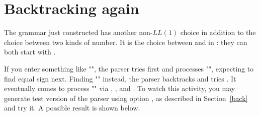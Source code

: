
\section{Backtracking again\label{back2}}


The grammar just constructed has another non-$LL(1)$ choice
in addition to the choice between two kinds of number.
It is the choice between  and  in \Input: 
they can both start with .

If you enter something like "",
the parser tries  first and processes "",
expecting to find equal sign next.
Finding "\tx{*}" instead, the parser backtracks and tries .
It eventually comes to process "" via , ,
and .
To watch this activity, you may generate test version of the parser using option ,
as described in Section~\ref{back} and try it.
A possible result is shown below.

